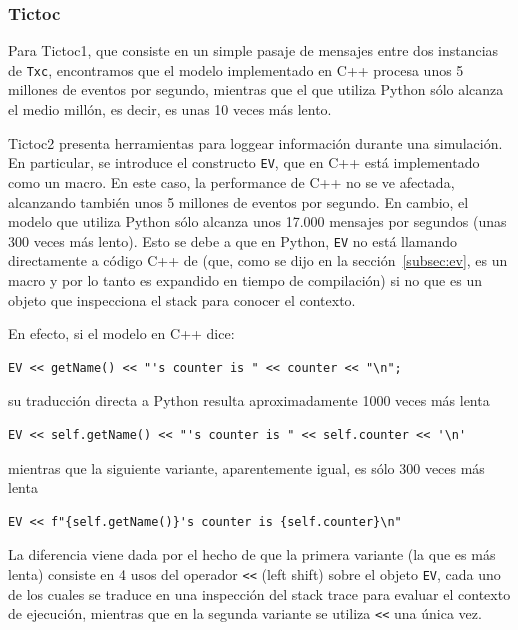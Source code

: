 \documentclass[]{article}
\begin{document}
\subsubsection{Tictoc}

Para Tictoc1, que consiste en un simple pasaje de mensajes entre dos instancias
de \verb!Txc!, encontramos que el modelo implementado en C++ procesa unos 5
millones de eventos por segundo, mientras que el que utiliza Python sólo
alcanza el medio millón, es decir, es unas 10 veces más lento.

Tictoc2 presenta herramientas para loggear información durante una simulación.
En particular, se introduce el constructo \verb!EV!, que en C++ está
implementado como un macro. En este caso, la performance de C++ no se ve
afectada, alcanzando también unos 5 millones de eventos por segundo. En cambio,
el modelo que utiliza Python sólo alcanza unos 17.000 mensajes por segundos
(unas 300 veces más lento). Esto se debe a que en Python, \verb!EV! no está
llamando directamente a código C++ de \omnetpp{} (que, como se dijo en la
sección~\ref{subsec:ev}, es un macro y por lo tanto es expandido en tiempo de
compilación) si no que es un objeto que inspecciona el stack para conocer el
contexto.

En efecto, si el modelo en C++ dice:

\begin{verbatim}
EV << getName() << "'s counter is " << counter << "\n";
\end{verbatim}

\noindent su traducción directa a Python resulta aproximadamente 1000 veces más
lenta

\begin{verbatim}
EV << self.getName() << "'s counter is " << self.counter << '\n'
\end{verbatim}

\noindent mientras que la siguiente variante, aparentemente igual, es sólo 300
veces más lenta

\begin{verbatim}
EV << f"{self.getName()}'s counter is {self.counter}\n"
\end{verbatim}

La diferencia viene dada por el hecho de que la primera variante (la que es más
lenta) consiste en 4 usos del operador \verb!<<! (left shift) sobre el objeto
\verb!EV!, cada uno de los cuales se traduce en una inspección del stack trace
para evaluar el contexto de ejecución, mientras que en la segunda variante se
utiliza \verb!<<! una única vez.
\end{document}
